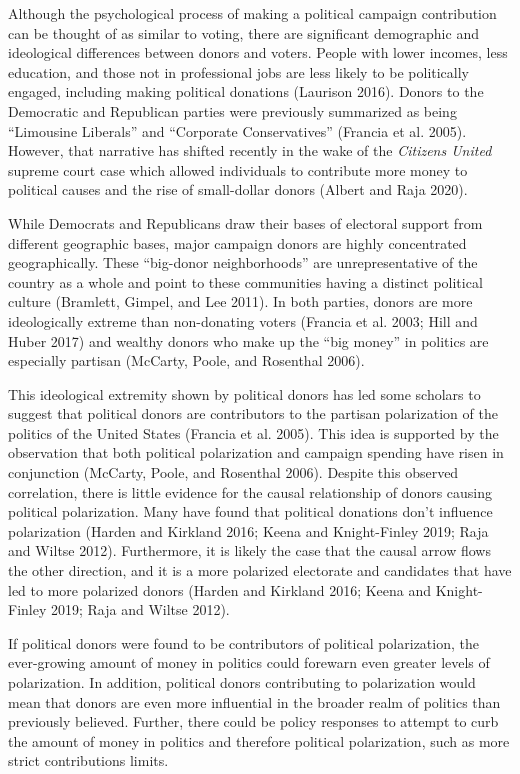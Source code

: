 \documentclass[12pt,]{article}
\begin{document}
Although the psychological process of making a political campaign
contribution can be thought of as similar to voting, there are
significant demographic and ideological differences between donors and
voters. People with lower incomes, less education, and those not in
professional jobs are less likely to be politically engaged, including
making political donations (Laurison 2016). Donors to the Democratic and
Republican parties were previously summarized as being ``Limousine
Liberals'' and ``Corporate Conservatives'' (Francia et al. 2005).
However, that narrative has shifted recently in the wake of the
\emph{Citizens United} supreme court case which allowed individuals to
contribute more money to political causes and the rise of small-dollar
donors (Albert and Raja 2020).

While Democrats and Republicans draw their bases of electoral support
from different geographic bases, major campaign donors are highly
concentrated geographically. These ``big-donor neighborhoods'' are
unrepresentative of the country as a whole and point to these
communities having a distinct political culture (Bramlett, Gimpel, and
Lee 2011). In both parties, donors are more ideologically extreme than
non-donating voters (Francia et al. 2003; Hill and Huber 2017) and
wealthy donors who make up the ``big money'' in politics are especially
partisan (McCarty, Poole, and Rosenthal 2006).

This ideological extremity shown by political donors has led some
scholars to suggest that political donors are contributors to the
partisan polarization of the politics of the United States (Francia et
al. 2005). This idea is supported by the observation that both political
polarization and campaign spending have risen in conjunction (McCarty,
Poole, and Rosenthal 2006). Despite this observed correlation, there is
little evidence for the causal relationship of donors causing political
polarization. Many have found that political donations don't influence
polarization (Harden and Kirkland 2016; Keena and Knight-Finley 2019;
Raja and Wiltse 2012). Furthermore, it is likely the case that the
causal arrow flows the other direction, and it is a more polarized
electorate and candidates that have led to more polarized donors (Harden
and Kirkland 2016; Keena and Knight-Finley 2019; Raja and Wiltse 2012).

If political donors were found to be contributors of political
polarization, the ever-growing amount of money in politics could
forewarn even greater levels of polarization. In addition, political
donors contributing to polarization would mean that donors are even more
influential in the broader realm of politics than previously believed.
Further, there could be policy responses to attempt to curb the amount
of money in politics and therefore political polarization, such as more
strict contributions limits.
\end{document}
